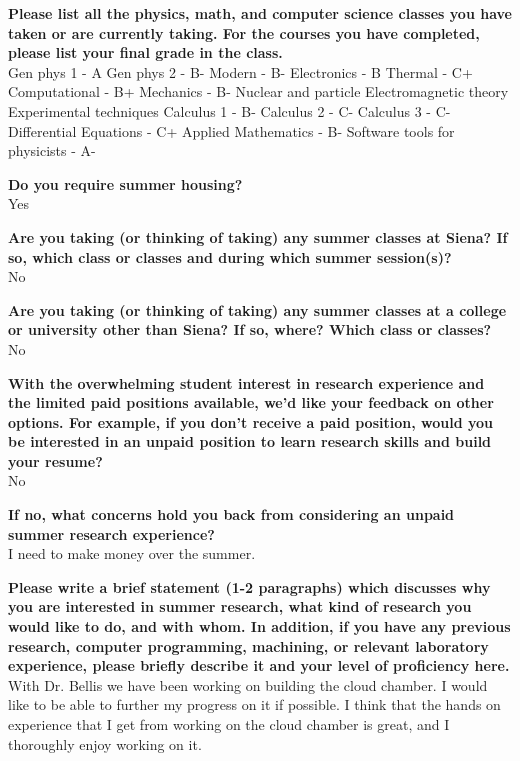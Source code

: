\documentclass[12pt,preprint]{aastex}
\begin{document}
 \vspace*{1mm}
{\bf Please list all the physics, math, and computer science classes you have taken or are currently taking.  For the courses you have completed, please list your final grade in the class.}\\
Gen phys 1 - A Gen phys 2 - B- Modern - B- Electronics - B Thermal - C+ Computational - B+ Mechanics - B- Nuclear and particle  Electromagnetic theory  Experimental techniques Calculus 1 - B- Calculus 2 - C- Calculus 3 - C- Differential Equations - C+ Applied Mathematics - B- Software tools for physicists - A-

\vspace*{3mm}
{\bf Do you require summer housing?}\\
Yes

\vspace*{3mm}
{\bf Are you taking (or thinking of taking) any summer classes at Siena?  If so, which class or classes and during which summer session(s)?}\\
No

\vspace*{3mm}
{\bf Are you taking (or thinking of taking) any summer classes at a college or university other than Siena?  If so, where?  Which class or classes?}\\
No

\vspace*{3mm}
{\bf With the overwhelming student interest in research experience and the limited paid positions available, we'd like your feedback on other options.  For example, if you don't receive a paid position, would you be interested in an unpaid position to learn research skills and build your resume?}\\
No

\vspace*{3mm}
{\bf If no, what concerns hold you back from considering an unpaid summer research experience?}\\
I need to make money over the summer.

\vspace*{3mm}
{\bf Please write a brief statement (1-2 paragraphs) which discusses why you are interested in summer research, what kind of research you would like to do, and with whom.  In addition, if you have any previous research, computer programming, machining, or relevant laboratory experience, please briefly describe it and your level of proficiency here.}\\
With Dr. Bellis we have been working on building the cloud chamber. I would like to be able to further my progress on it if possible. I think that the hands on experience that I get from working on the cloud chamber is great, and I thoroughly enjoy working on it. 
\end{document}
